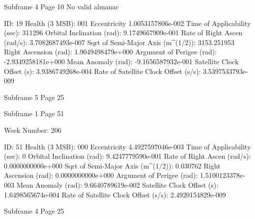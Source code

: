  Subframe  4 Page 10
No valid almanac

 ID:				     19
 Health (3 MSB):		     001
 Eccentricity			     1.0053157806e-002
 Time of Applicability (sec):	       311296
 Orbital Inclination (rad):	     9.1749667909e-001
 Rate of Right Ascen (rad/s):	     3.7082687493e-007
 Sqrt of Semi-Major Axis (m^(1/2)):  3153.251953
 Right Ascension (rad): 	     1.9049498479e+000
 Argument of Perigee (rad):	     -2.9349258181e+000
 Mean Anomaly (rad):		     -9.1656587932e-001
 Satellite Clock Offset (s):	     3.9386749268e-004
 Rate of Satellite Clock Offset (s/s): 3.5397533793e-009

 Subframe  5 Page 25


 Subframe  1 Page 51

 Week Number:	 206

 ID:				     51
 Health (3 MSB):		     000
 Eccentricity			     4.4927597046e-003
 Time of Applicability (sec):		    0
 Orbital Inclination (rad):	     9.4247779590e-001
 Rate of Right Ascen (rad/s):	     0.0000000000e+000
 Sqrt of Semi-Major Axis (m^(1/2)):    0.030762
 Right Ascension (rad): 	     0.0000000000e+000
 Argument of Perigee (rad):	     1.5100123378e-003
 Mean Anomaly (rad):		     9.6640789619e-002
 Satellite Clock Offset (s):	     1.6498565674e-004
 Rate of Satellite Clock Offset (s/s): 2.4920154829e-009

 Subframe  4 Page 25
